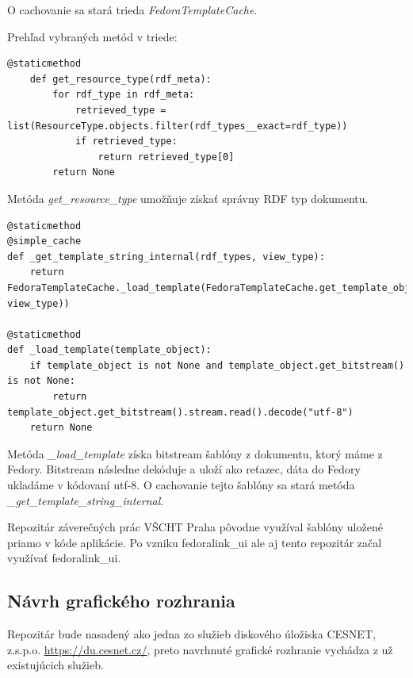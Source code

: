 \documentclass[thesis=M,slovak]{FITthesis}[2013/05/06]
\begin{document}
O cachovanie sa stará trieda {\em FedoraTemplateCache}.

Prehľad vybraných metód v triede:
\begin{lstlisting}[frame=single] 
@staticmethod
    def get_resource_type(rdf_meta):
        for rdf_type in rdf_meta:
            retrieved_type = list(ResourceType.objects.filter(rdf_types__exact=rdf_type))
            if retrieved_type:
                return retrieved_type[0]
        return None
\end{lstlisting}
Metóda {\em get\_resource\_type} umožňuje získať správny RDF typ dokumentu.

\begin{lstlisting}[frame=single] 
@staticmethod
@simple_cache
def _get_template_string_internal(rdf_types, view_type):
    return FedoraTemplateCache._load_template(FedoraTemplateCache.get_template_object(rdf_types, view_type))

@staticmethod
def _load_template(template_object):
    if template_object is not None and template_object.get_bitstream() is not None:
        return template_object.get_bitstream().stream.read().decode("utf-8")
    return None
\end{lstlisting}
Metóda {\em \_load\_template} získa bitstream šablóny z dokumentu, ktorý máme z Fedory. Bitstream následne dekóduje a uloží ako reťazec, dáta do Fedory ukladáme v kódovaní \mbox{utf-8}. O cachovanie tejto šablóny sa stará metóda {\em \_get\_template\_string\_internal}.

Repozitár záverečných prác VŠCHT Praha pôvodne využíval šablóny uložené priamo v kóde aplikácie. Po vzniku fedoralink\_ui ale aj tento repozitár začal využívať fedoralink\_ui.

\subsection{Návrh grafického rozhrania}
Repozitár bude nasadený ako jedna zo služieb diskového úložiska CESNET, z.s.p.o. \url{https://du.cesnet.cz/}, preto navrhnuté grafické rozhranie vychádza z už existujúcich služieb.
\end{document}
